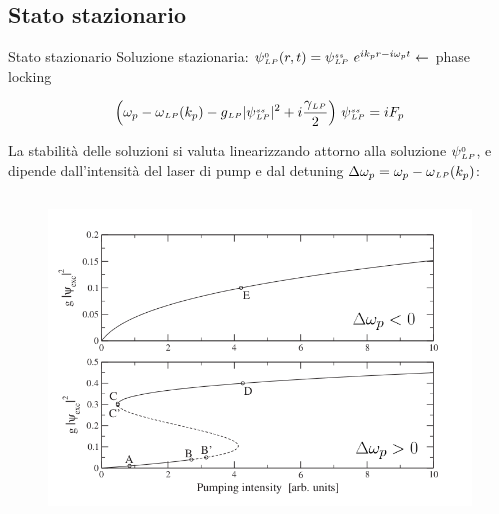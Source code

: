 \documentclass[10pt]{beamer}
\begin{document}
\subsection{Stato stazionario}

\begin{frame}{Stato stazionario}
%
Soluzione stazionaria: \( \psi{\scriptstyle^{0}_{ LP}}(r,t) = \psi{\scriptstyle ^{ss}_{LP}} \ e^{ik_pr - i\omega_p t}  \leftarrow\) \alert{phase locking}

\[
 \left( \omega_p - \omega{\scriptstyle _{LP}} (k_p) - g{\scriptstyle _{LP}} |\psi{\scriptstyle ^{ss}_{LP}}|^2 + i \frac{\gamma{\scriptstyle _{LP}}}{2} \right)\, \psi{\scriptstyle ^{ss}_{LP}} = i F_p
\]

La stabilità delle soluzioni si valuta linearizzando attorno alla soluzione $\psi{\scriptstyle^{0}_{ LP}}$, e dipende dall'intensità del laser di pump e dal detuning \(\Delta \omega_p = \omega_p - \omega{\scriptstyle _{LP}}(k_p)\):
\begin{columns}[t]
 \begin{column}{.5\textwidth}
  \begin{figure}
   \includegraphics[width=\columnwidth]{pics/Shapevspump.png}
  \end{figure}

 \end{column}


\end{columns}
\end{frame}
\end{document}
